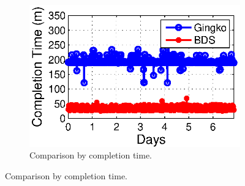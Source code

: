 \begin{figure}[t]
\begin{subfigure}[b]{0.3\textwidth}
                \label{fig:BDSvsAnon:FCT}
        \end{subfigure}
        \begin{subfigure}[b]{0.3\textwidth}
                \centering
                \includegraphics[width=\textwidth]{images/BDSvsAnon_time_v2.eps}
                \caption{Comparison by completion time.}
                \label{fig:BDSvsAnon:time}
        \end{subfigure}
        \label{fig:BDSvsAnon}
\vspace{-0.4cm}
\end{figure}

